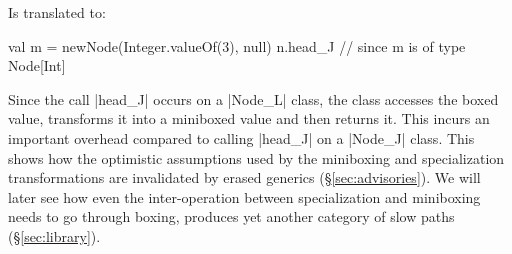 Is translated to:

\begin{lstlisting-nobreak}
 val m = newNode(Integer.valueOf(3), null)
 n.head_J // since m is of type Node[Int]
\end{lstlisting-nobreak}

Since the call |head_J| occurs on a |Node_L| class, the class accesses the boxed value, transforms it into a miniboxed value and then returns it. This incurs an important overhead compared to calling |head_J| on a |Node_J| class. This shows how the optimistic assumptions used by the miniboxing and specialization transformations are invalidated by erased generics (\S\ref{sec:advisories}). We will later see how even the inter-operation between specialization and miniboxing needs to go through boxing, produces yet another category of slow paths (\S\ref{sec:library}).

